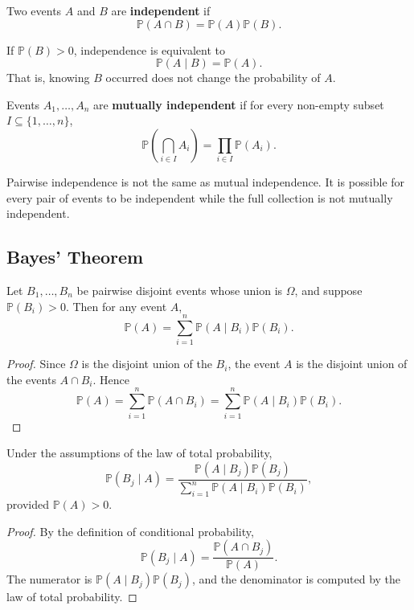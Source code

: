 \begin{definition}
Two events $A$ and $B$ are \textbf{independent} if
\[
    \mathbb{P}(A\cap B)=\mathbb{P}(A)\mathbb{P}(B).
\]
\end{definition}

If $\mathbb{P}(B)>0$, independence is equivalent to
\[
    \mathbb{P}(A\mid B)=\mathbb{P}(A).
\]
That is, knowing $B$ occurred does not change the probability of $A$.

\begin{definition}
Events $A_1,\dots,A_n$ are \textbf{mutually independent} if for every non-empty subset $I\subseteq\{1,\dots,n\}$,
\[
    \mathbb{P}\left(\bigcap_{i\in I}A_i\right)=\prod_{i\in I}\mathbb{P}(A_i).
\]
\end{definition}

\begin{remark}
Pairwise independence is not the same as mutual independence. It is possible for every pair of events to be independent while the full collection is not mutually independent.
\end{remark}

\subsection{Bayes' Theorem}

\begin{theorem}
Let $B_1,\dots,B_n$ be pairwise disjoint events whose union is $\Omega$, and suppose $\mathbb{P}(B_i)>0$. Then for any event $A$,
\[
    \mathbb{P}(A)=\sum_{i=1}^{n}\mathbb{P}(A\mid B_i)\mathbb{P}(B_i).
\]
\end{theorem}

\begin{proof}
Since $\Omega$ is the disjoint union of the $B_i$, the event $A$ is the disjoint union of the events $A\cap B_i$. Hence
\[
    \mathbb{P}(A)=\sum_{i=1}^{n}\mathbb{P}(A\cap B_i)
    =\sum_{i=1}^{n}\mathbb{P}(A\mid B_i)\mathbb{P}(B_i).
\]
\end{proof}

\begin{theorem}
Under the assumptions of the law of total probability,
\[
    \mathbb{P}(B_j\mid A)=
    \frac{\mathbb{P}(A\mid B_j)\mathbb{P}(B_j)}{\sum_{i=1}^{n}\mathbb{P}(A\mid B_i)\mathbb{P}(B_i)},
\]
provided $\mathbb{P}(A)>0$.
\end{theorem}

\begin{proof}
By the definition of conditional probability,
\[
    \mathbb{P}(B_j\mid A)=\frac{\mathbb{P}(A\cap B_j)}{\mathbb{P}(A)}.
\]
The numerator is $\mathbb{P}(A\mid B_j)\mathbb{P}(B_j)$, and the denominator is computed by the law of total probability.
\end{proof}

